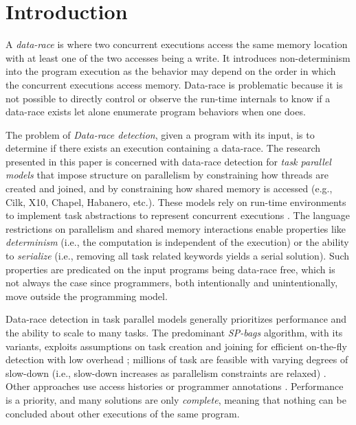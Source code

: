 \section{Introduction}
A \emph{data-race} is where two concurrent executions access the same memory location with at least one of the two accesses being a write. It introduces non-determinism into the program execution as the behavior may depend on the order in which the concurrent executions access memory. Data-race is problematic because it is not possible to directly control or observe the run-time internals to know if a data-race exists let alone enumerate program behaviors when one does.

The problem of \emph{Data-race detection}, given a program with its input, is to determine if there exists an execution containing a data-race. The research presented in this paper is concerned with data-race detection for \emph{task parallel models} that impose structure on parallelism by constraining how threads are created and joined, and by constraining how shared memory is accessed (e.g., Cilk, X10, Chapel, Habanero, etc.). These models rely on run-time environments to implement task abstractions to represent concurrent executions \cite{blumofe1996cilk,charles2005x10,cave2011habanero,imam2014habanero}. The language restrictions on parallelism and shared memory interactions enable properties like \emph{determinism} (i.e., the computation is independent of the execution) or the ability to \emph{serialize} (i.e., removing all task related keywords yields a serial solution). Such properties are predicated on the input programs being data-race free, which is not always the case since programmers, both intentionally and unintentionally, move outside the programming model.


Data-race detection in task parallel models generally prioritizes performance and the ability to scale to many tasks. The predominant \emph{SP-bags} algorithm, with its variants, exploits assumptions on task creation and joining for efficient on-the-fly detection with low overhead \cite{Feng1997EDD258492258493,Cheng1998DDR277651277696,Bender2004OMS10079121007933,Async-Finish-Race,Utterback2016PGP29357642935801}; millions of task are feasible with varying degrees of slow-down (i.e., slow-down increases as parallelism constraints are relaxed) \cite{drdForFutures,Surendran2016}. Other approaches use access histories \cite{mellor1991fly,raman2012scalable} or programmer annotations \cite{westbrook2012practical, westbrook2012permission}.
Performance is a priority, and many solutions are only \emph{complete}, meaning that nothing can be concluded about other executions of the same program.

